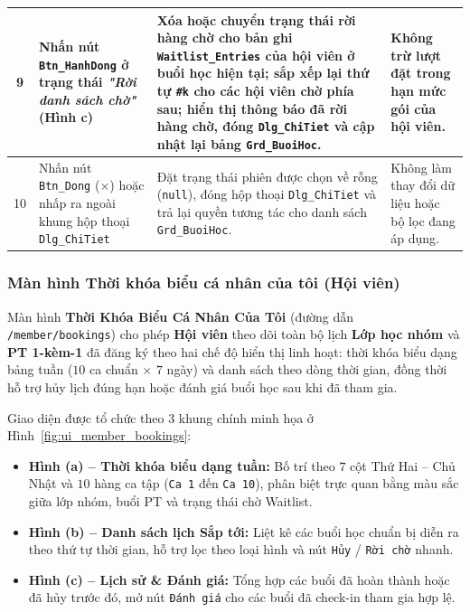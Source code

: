 \documentclass[a4paper,12pt]{article}
\begin{document}
{\begin{longtable}{|c|L{3.5cm}|L{7.8cm}|L{3.5cm}|}
9 & Nhấn nút \texttt{Btn\_HanhDong} ở trạng thái \textit{"Rời danh sách chờ"} (Hình c) &
Xóa hoặc chuyển trạng thái rời hàng chờ cho bản ghi \texttt{Waitlist\_Entries} của hội viên ở buổi học hiện tại; sắp xếp lại thứ tự \texttt{\#k} cho các hội viên chờ phía sau; hiển thị thông báo đã rời hàng chờ, đóng \texttt{Dlg\_ChiTiet} và cập nhật lại bảng \texttt{Grd\_BuoiHoc}. &
Không trừ lượt đặt trong hạn mức gói của hội viên. \\ \hline

10 & Nhấn nút \texttt{Btn\_Dong} ($\times$) hoặc nhấp ra ngoài khung hộp thoại \texttt{Dlg\_ChiTiet} &
Đặt trạng thái phiên được chọn về rỗng (\texttt{null}), đóng hộp thoại \texttt{Dlg\_ChiTiet} và trả lại quyền tương tác cho danh sách \texttt{Grd\_BuoiHoc}. &
Không làm thay đổi dữ liệu hoặc bộ lọc đang áp dụng. \\ \hline

\end{longtable}
}


\subsubsection{Màn hình Thời khóa biểu cá nhân của tôi (Hội viên)}
Màn hình \textbf{Thời Khóa Biểu Cá Nhân Của Tôi} (đường dẫn \texttt{/member/bookings}) cho phép \textbf{Hội viên} theo dõi toàn bộ lịch \textbf{Lớp học nhóm} và \textbf{PT 1-kèm-1} đã đăng ký theo hai chế độ hiển thị linh hoạt: thời khóa biểu dạng bảng tuần ($10$ ca chuẩn $\times$ $7$ ngày) và danh sách theo dòng thời gian, đồng thời hỗ trợ hủy lịch đúng hạn hoặc đánh giá buổi học sau khi đã tham gia.

Giao diện được tổ chức theo 3 khung chính minh họa ở Hình~\ref{fig:ui_member_bookings}:
\begin{itemize}
    \item \textbf{Hình (a) -- Thời khóa biểu dạng tuần:} Bố trí theo $7$ cột Thứ Hai -- Chủ Nhật và $10$ hàng ca tập (\texttt{Ca 1} đến \texttt{Ca 10}), phân biệt trực quan bằng màu sắc giữa lớp nhóm, buổi PT và trạng thái chờ Waitlist.
    \item \textbf{Hình (b) -- Danh sách lịch Sắp tới:} Liệt kê các buổi học chuẩn bị diễn ra theo thứ tự thời gian, hỗ trợ lọc theo loại hình và nút \texttt{Hủy} / \texttt{Rời chờ} nhanh.
    \item \textbf{Hình (c) -- Lịch sử \& Đánh giá:} Tổng hợp các buổi đã hoàn thành hoặc đã hủy trước đó, mở nút \texttt{Đánh giá} cho các buổi đã check-in tham gia hợp lệ.
\end{itemize}
\end{document}
